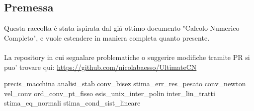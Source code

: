 \documentclass[12pt,a4paper,headings=optiontohead]{article}
\begin{document}
\begin{center}
\pagebreak

\section*{Premessa}
\begin{minipage}{0.9\textwidth} \large

Questa raccolta é stata ispirata dal giá ottimo documento "Calcolo Numerico Completo", e vuole estendere in maniera completa quanto presente.\\\\
La repository in cui segnalare problematiche o suggerire modifiche tramite PR si puo' trovare qui: \href{https://github.com/nicolabaesso/UltimateCN}{https://github.com/nicolabaesso/UltimateCN}

\end{minipage}

\end{center}
\pagebreak


\tableofcontents

\newpage
{precis_macchina}
\newpage
{analisi_stab}
{conv_bisez}
\newpage
{stima_err_res_pesato}
\newpage
{conv_newton}
\newpage
{vel_conv}
\newpage
{ord_conv_pt_fisso}
\newpage
{esis_unix_inter_polin}
\newpage
{inter_lin_tratti}
\newpage
{stima_eq_normali}
\newpage
{stima_cond_sist_lineare}
\end{document}
